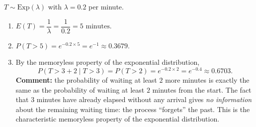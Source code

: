 \documentclass[11pt]{article}
\begin{document}
\begin{corrige}
$T \sim \mathrm{Exp}(\lambda)$ with $\lambda = 0.2$ per minute.

\begin{enumerate}
\item $E(T) = \dfrac{1}{\lambda} = \dfrac{1}{0.2} = \boxed{5 \text{ minutes}}$.

\item $P(T > 5) = e^{-0.2 \times 5} = e^{-1} \approx \boxed{0.3679}$.

\item By the memoryless property of the exponential distribution,
\[
P(T > 3 + 2 \mid T > 3) = P(T > 2) = e^{-0.2 \times 2} = e^{-0.4} \approx \boxed{0.6703}.
\]
\textbf{Comment:} the probability of waiting at least $2$ more minutes is exactly the same as the probability of waiting at least $2$ minutes from the start. The fact that $3$ minutes have already elapsed without any arrival gives \emph{no information} about the remaining waiting time: the process ``forgets'' the past. This is the characteristic memoryless property of the exponential distribution.
\end{enumerate}
\end{corrige}
\end{document}
